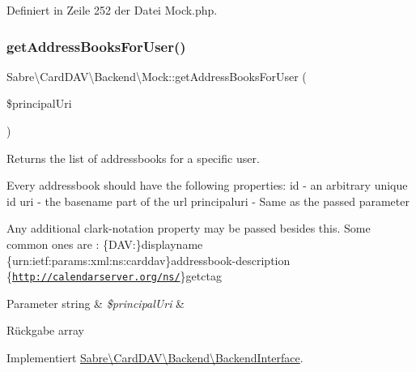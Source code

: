 Definiert in Zeile 252 der Datei Mock.\+php.

\mbox{\label{class_sabre_1_1_card_d_a_v_1_1_backend_1_1_mock_a0ae33e7e452d483b0450754be445bc34}} 
\subsubsection{\texorpdfstring{get\+Address\+Books\+For\+User()}{getAddressBooksForUser()}}
{\footnotesize\ttfamily Sabre\textbackslash{}\+Card\+D\+A\+V\textbackslash{}\+Backend\textbackslash{}\+Mock\+::get\+Address\+Books\+For\+User (\begin{DoxyParamCaption}\item[{}]{\$principal\+Uri }\end{DoxyParamCaption})}

Returns the list of addressbooks for a specific user.

Every addressbook should have the following properties\+: id -\/ an arbitrary unique id uri -\/ the \textquotesingle{}basename\textquotesingle{} part of the url principaluri -\/ Same as the passed parameter

Any additional clark-\/notation property may be passed besides this. Some common ones are \+: \{D\+AV\+:\}displayname \{urn\+:ietf\+:params\+:xml\+:ns\+:carddav\}addressbook-\/description \{\href{http://calendarserver.org/ns/}{\tt http\+://calendarserver.\+org/ns/}\}getctag


\begin{DoxyParams}[1]{Parameter}
string & {\em \$principal\+Uri} & \\
\hline
\end{DoxyParams}
\begin{DoxyReturn}{Rückgabe}
array 
\end{DoxyReturn}


Implementiert \mbox{\hyperlink{interface_sabre_1_1_card_d_a_v_1_1_backend_1_1_backend_interface_a47302ae5f71c46e7e729f20fb4be65ec}{Sabre\textbackslash{}\+Card\+D\+A\+V\textbackslash{}\+Backend\textbackslash{}\+Backend\+Interface}}.



